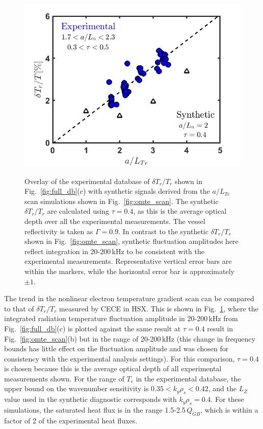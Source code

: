 \documentclass[%
 aip,
 amsmath,amssymb,
 reprint,%
]{revtex4-1}
\begin{document}
\begin{figure}[!htbp]
  \centering
  {\includegraphics[width=.5\textwidth]{Figures/db_exp_vs_sim_final_line_nobar.png}}
\hfill

\caption{Overlay of the experimental database of $\delta T_r/T_r$ shown in Fig.\ \ref{fig:full_db}(c) with synthetic signals derived from the $a/L_{Te}$ scan simulations shown in Fig.\ \ref{fig:omte_scan}. The synthetic $\delta T_r/T_r$ are calculated using $\tau=0.4$, as this is the average optical depth over all the experimental measurements. The vessel reflectivity is taken as $\Gamma=0.9$. In contrast to the synthetic $\delta T_r/T_r$ shown in Fig.\ \ref{fig:omte_scan}, synthetic fluctuation amplitudes here reflect integration in 20-200\,kHz to be consistent with the experimental measurements. Representative vertical error bars are within the markers, while the horizontal error bar is approximately $\pm 1$.}
  \label{fig:omte_exp_synth}
\end{figure}


The trend in the nonlinear electron temperature gradient scan can be compared to that of $\delta T_r/T_r$ measured by CECE in HSX. This is shown in Fig.\ \ref{fig:omte_exp_synth}, where the integrated radiation temperature fluctuation amplitude in 20-200\,kHz from Fig.\ \ref{fig:full_db}(c) is plotted against the same result at $\tau=0.4$ result in Fig.\ \ref{fig:omte_scan}(b) but in the range of 20-200\,kHz (this change in frequency bounds has little effect on the fluctuation amplitude and was chosen for consistency with the experimental analysis settings). For this comparison, $\tau=0.4$ is chosen because this is the average optical depth of all experimental measurements shown. For the range of $T_e$ in the experimental database, the upper bound on the wavenumber sensitivity is $0.35 < k_y \rho_s <0.42$, and the $L_Z$ value used in the synthetic diagnostic corresponds with $k_y \rho_s = 0.4$. For these simulations, the saturated heat flux is in the range 1.5-2.5\,$Q_{GB}$, which is within a factor of 2 of the experimental heat fluxes.  
\end{document}
